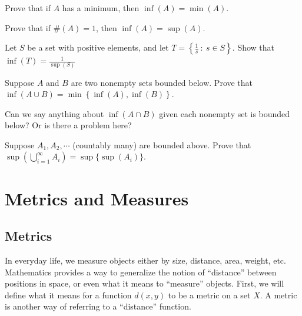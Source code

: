 \begin{exercise}
    Prove that if $A$ has a minimum, then $\inf(A)=\min(A)$.
\end{exercise}
    \vspace{-4mm}
\begin{exercise}
    Prove that if $\#(A)=1$, then $\inf(A)=\sup(A)$.
\end{exercise}
    \vspace{-4mm}
\begin{exercise}
    Let $S$ be a set with positive elements, and let $T=\left\{\frac{1}{s}\ :\ s\in S\right\}$. Show that $\inf(T)=\frac{1}{\sup(S)}$ 
\end{exercise}
    \vspace{-4mm}
\begin{exercise}
    Suppose $A$ and $B$ are two nonempty sets bounded below. Prove that $\inf(A\cup B)=\min\left\{\inf(A),\inf(B)\right\}$.
\end{exercise}
    \vspace{-4mm}
\begin{exercise}
    Can we say anything about $\inf(A\cap B)$ given each nonempty set is bounded below? Or is there a problem here?
\end{exercise}
    \vspace{-4mm}
\begin{exercise}[Challenge]
    Suppose $A_1,A_2,\cdots$ (countably many) are bounded above. Prove that $\sup(\bigcup_{i=1}^\infty A_i)=\sup\{\sup(A_i)\}$.
\end{exercise}



\clearpage

\section{Metrics and Measures}

\subsection{Metrics}


In everyday life, we measure objects either by size, distance, area, weight, etc. Mathematics provides a way to generalize the notion of ``distance'' between positions in space, or even what it means to ``measure'' objects. First, we will define what it means for a function $d(x,y)$ to be a metric on a set $X$. A metric is another way of referring to a ``distance'' function.\par\newline

